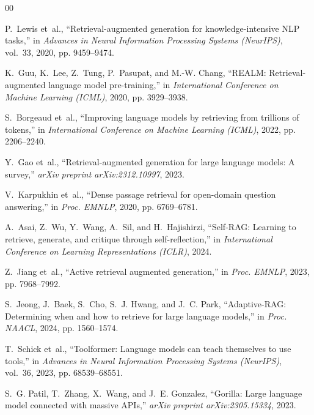 \documentclass[journal,10pt,twocolumn]{IEEEtran}
\begin{document}
\begin{thebibliography}{00}

P.~Lewis et~al., ``Retrieval-augmented generation for knowledge-intensive {NLP} tasks,'' in \textit{Advances in Neural Information Processing Systems (NeurIPS)}, vol.~33, 2020, pp. 9459--9474.

K.~Guu, K.~Lee, Z.~Tung, P.~Pasupat, and M.-W. Chang, ``{REALM}: Retrieval-augmented language model pre-training,'' in \textit{International Conference on Machine Learning (ICML)}, 2020, pp. 3929--3938.

S.~Borgeaud et~al., ``Improving language models by retrieving from trillions of tokens,'' in \textit{International Conference on Machine Learning (ICML)}, 2022, pp. 2206--2240.

Y.~Gao et~al., ``Retrieval-augmented generation for large language models: A survey,'' \textit{arXiv preprint arXiv:2312.10997}, 2023.

V.~Karpukhin et~al., ``Dense passage retrieval for open-domain question answering,'' in \textit{Proc. EMNLP}, 2020, pp. 6769--6781.

A.~Asai, Z.~Wu, Y.~Wang, A.~Sil, and H.~Hajishirzi, ``Self-{RAG}: Learning to retrieve, generate, and critique through self-reflection,'' in \textit{International Conference on Learning Representations (ICLR)}, 2024.

Z.~Jiang et~al., ``Active retrieval augmented generation,'' in \textit{Proc. EMNLP}, 2023, pp. 7968--7992.

S.~Jeong, J.~Baek, S.~Cho, S.~J. Hwang, and J.~C. Park, ``Adaptive-{RAG}: Determining when and how to retrieve for large language models,'' in \textit{Proc. NAACL}, 2024, pp. 1560--1574.

T.~Schick et~al., ``Toolformer: Language models can teach themselves to use tools,'' in \textit{Advances in Neural Information Processing Systems (NeurIPS)}, vol.~36, 2023, pp. 68539--68551.

S.~G. Patil, T.~Zhang, X.~Wang, and J.~E. Gonzalez, ``Gorilla: Large language model connected with massive {APIs},'' \textit{arXiv preprint arXiv:2305.15334}, 2023.


\end{thebibliography}
\end{document}
